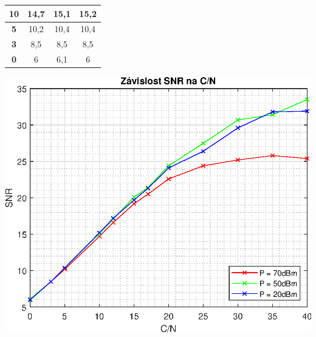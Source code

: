\documentclass[10pt, a4paper]{article}%
\begin{document}
\begin{table}[ht!]
\begin{minipage}{0.48\textwidth}
{\begin{tabular}{|cccc|}
    \multicolumn{1}{|c|}{\textbf{10}}      & \multicolumn{1}{c|}{14,7}            & \multicolumn{1}{c|}{15,1}            & 15,2            \\ \hline
    \multicolumn{1}{|c|}{\textbf{5}}       & \multicolumn{1}{c|}{10,2}            & \multicolumn{1}{c|}{10,4}            & 10,4            \\ \hline
    \multicolumn{1}{|c|}{\textbf{3}}       & \multicolumn{1}{c|}{8,5}             & \multicolumn{1}{c|}{8,5}             & 8,5             \\ \hline
    \multicolumn{1}{|c|}{\textbf{0}}       & \multicolumn{1}{c|}{6}               & \multicolumn{1}{c|}{6,1}             & 6               \\ \hline
    \end{tabular}%
    }
\end{minipage}
\hfill
\begin{minipage}{0.48\textwidth}
    \centering
    \includegraphics[width=1\textwidth]{SNR_CN.eps}
\end{minipage}

\end{table}
\end{document}
